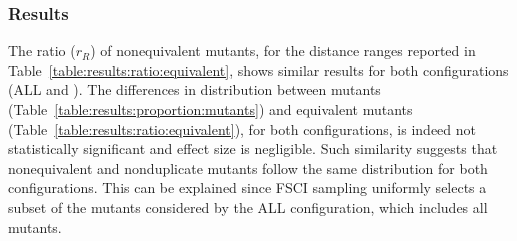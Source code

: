 




\subsubsection{Results}


The ratio ($r_R$) of nonequivalent mutants, for the distance ranges reported in Table~\ref{table:results:ratio:equivalent}, shows
similar results for both configurations (ALL and \APPR).
The differences in distribution between mutants (Table~\ref{table:results:proportion:mutants}) and equivalent mutants  (Table~\ref{table:results:ratio:equivalent}), for both  configurations, is indeed not statistically significant and effect size is negligible.
Such similarity suggests that nonequivalent and nonduplicate mutants follow the same distribution for both configurations. This can be explained since
FSCI sampling uniformly selects
a subset of the mutants considered by the ALL configuration, which includes all mutants.




